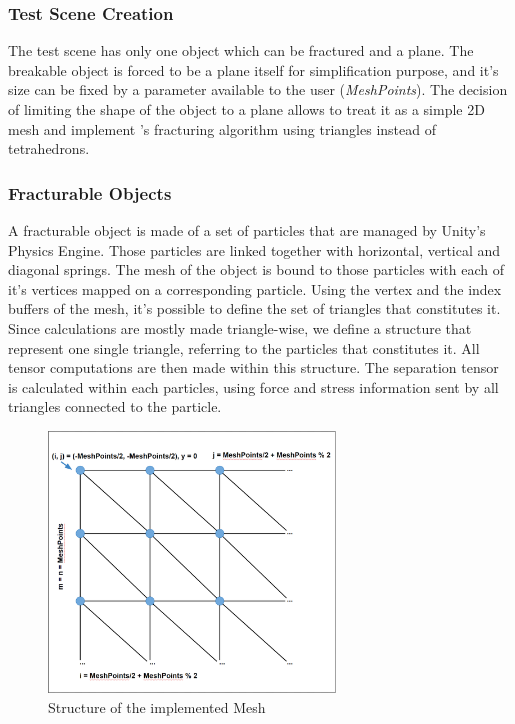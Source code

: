 \documentclass[tog]{acmsiggraph}
\begin{document}
\subsubsection{Test Scene Creation}
The test scene has only one object which can be fractured and a plane. The breakable object is forced to be a plane itself for simplification purpose, and it's size can be fixed by a parameter available to the user (\textit{MeshPoints}). The decision of limiting the shape of the object to a plane allows to treat it as a simple 2D mesh and implement \cite{Obrien:1999:GMA}'s fracturing algorithm using triangles instead of tetrahedrons. 

\subsubsection{Fracturable Objects}
A fracturable object is made of a set of particles that are managed by Unity's Physics Engine. Those particles are linked together with horizontal, vertical and diagonal springs. The mesh of the object is bound to those particles with each of it's vertices mapped on a corresponding particle. Using the vertex and the index buffers of the mesh, it's possible to define the set of triangles that constitutes it. Since calculations are mostly made triangle-wise, we define a structure that represent one single triangle, referring to the particles that constitutes it. All tensor computations are then made within this structure. The separation tensor is calculated within each particles, using force and stress information sent by all triangles connected to the particle. 

\begin{figure}[ht]
  \centering
  \includegraphics[width=3.0in]{images/MeshDescription}
  \caption{Structure of the implemented Mesh}
  \label{fig:meshdescription}
\end{figure}
\end{document}
